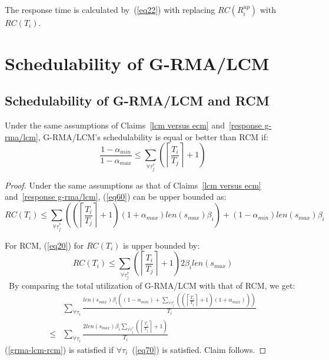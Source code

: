 The response time is calculated by~(\ref{eq22}) with replacing $RC(R_i^{up})$ with $RC(T_i)$.

\section{Schedulability of G-RMA/LCM}
\label{rma eval}

\subsection{Schedulability of G-RMA/LCM and RCM}

\begin{clm}\label{rma_eval_clm}
Under the same assumptions of Claims~\ref{lcm versus ecm} and~\ref{response g-rma/lcm}, G-RMA/LCM's schedulability is equal or better than RCM if:
\begin{equation}
\frac{1-\alpha_{min}}{1-\alpha_{max}}\le \sum_{\forall \tau_j^*}\left( \left\lceil\frac{T_i}{T_j}\right\rceil +1 \right)
\label{eq70}\end{equation}
\end{clm}

\begin{proof}\normalfont
Under the same assumptions as that of Claims~\ref{lcm versus ecm} and~\ref{response g-rma/lcm}, (\ref{eq60}) can be upper bounded as:
\begin{equation}
RC(T_i) \le \sum_{\forall \tau_{j}^{*}}\left(\left(\left\lceil\frac{T_{i}}{T_{j}}\right\rceil +1\right)(1+\alpha_{max}) len(s_{max})\beta_{i}\right) + (1-\alpha_{min})len(s_{max})\beta_{i}\label{eq68}\end{equation} 
 
For RCM, (\ref{eq20}) for $RC(T_{i})$ is upper bounded by:
\begin{equation*}
RC(T_{i})\le\sum_{\forall \tau_{j}^{*}}\left(\left\lceil\frac{T_{i}}{T_{j}}\right\rceil +1\right)2\beta_{i}len(s_{max})\label{eq69}\end{equation*}\
By comparing the total utilization of G-RMA/LCM with that of RCM,
we get:
\begin{eqnarray}
 & \sum_{\forall\tau_{i}}\frac{len\left(s_{max}\right)\beta_{i}\left(\left(1-\alpha_{min}\right)+\sum_{\forall\tau_{j}^{*}}\left(\left(\left\lceil\frac{T_{i}}{T_{j}}\right\rceil+1\right)\left(1+\alpha_{max}\right)\right)\right)}{T_{i}}\nonumber\\
\le & \sum_{\forall\tau_{i}}\frac{2len\left(s_{max}\right)\beta_{i}\sum_{\forall\tau_{j}^{*}}\left(\left\lceil\frac{T_{i}}{T_{j}}\right\rceil+1\right)}{T_{i}}\label{grma-lcm-rcm}\end{eqnarray}
(\ref{grma-lcm-rcm}) is satisfied if $\forall \tau_i$~(\ref{eq70}) is satisfied. Claim follows.
\end{proof}



